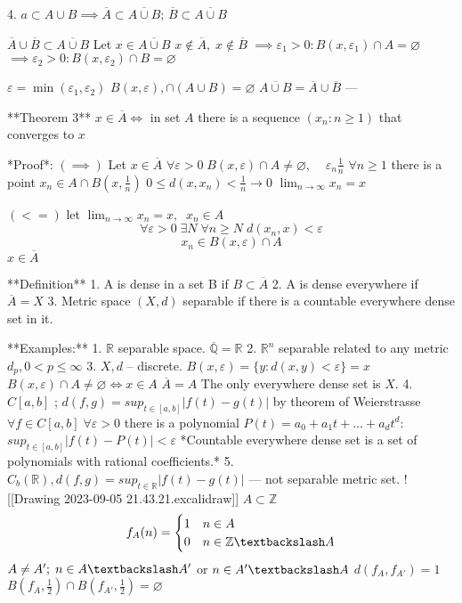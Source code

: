 4. $a \subset A \cup B \implies \overline{A} \subset \overline{A \cup B}$; $\overline{B} \subset \overline{A \cup B}$

$\overline{A} \cup \overline{B} \subset \overline{A \cup B}$
Let $x \in \overline{A \cup B}$
$x \not\in \overline{A}, \; x\not\in \overline{B}$
$\implies \varepsilon_{1} > 0 : B(x, \varepsilon_{1}) \cap A = \varnothing$
$\implies \varepsilon_{2} > 0 : B(x, \varepsilon_{2}) \cap B = \varnothing$

$\varepsilon = \min(\varepsilon_{1}, \varepsilon_{2})$
$B(x, \varepsilon), \cap (A \cup B) = \varnothing$
$\overline{A \cup B} = \overline{A} \cup \overline{B}$
---

**Theorem 3**
$x \in \overline{A} \iff$ in set $A$ there is a sequence $(x_{n}: n \geq 1)$ that converges to $x$

*Proof*:
$(\implies)$
Let $x \in \overline{A}$
$\forall \varepsilon > 0 \; B(x, \varepsilon) \cap A \neq \varnothing, \;\;\;\; \varepsilon_{n} \frac{1}{n}$
$\forall n \geq 1$ there is a point $x_{n} \in A \cap B(x, \frac{1}{n})$
$0 \leq d(x, x_{n}) < \frac{1}{n} \to 0$
$\lim_{ n \to \infty }x_{n} = x$

$(< =)$
let $\lim_{ n \to \infty }x_{n} = x, \;\; x_{n} \in A$
$$
\forall \varepsilon > 0 \; \exists N \; \forall n \geq N \; d(x_{n}, x) < \varepsilon
$$
$$
x_{n} \in B(x, \varepsilon) \cap A
$$
$x \in \overline{A}$

**Definition**
1. A is dense in a set B if $B \subset \overline{A}$
2. A is dense everywhere if $\overline{A} = X$
3. Metric space $(X, d)$ separable if there is a countable everywhere dense set in it.

**Examples:**
1. $\mathbb{R}$ separable space. $\overline{\mathbb{Q}} = \mathbb{R}$
2. $\mathbb{R}^n$ separable related to any metric $d_{p}, 0 < p \leq \infty$
3. $X, d$ – discrete. $B(x, \varepsilon) = \{ y: d(x, y) < \varepsilon \} = x$
   $B(x, \varepsilon) \cap A \neq \varnothing \iff x \in A$
   $\overline{A} = A$
   The only everywhere dense set is $X$.
4. $C[a,b]$ ; $d(f,g) = sup_{t \in [a,b]} |f(t) - g(t)|$
   by theorem of Weierstrasse $\forall f \in C[a,b] \; \forall \varepsilon > 0$ there is a polynomial $P(t) = a_{0} + a_{1}t + \dots + a_{d}t^d$: $sup_{t\in [a,b]} |f(t) - P(t)| < \varepsilon$
   *Countable everywhere dense set is a set of polynomials with rational coefficients.*
   5. $C_{b}(\mathbb{R}), d(f,g) = sup_{t \in \mathbb{R}} |f(t) - g(t)|$ — not separable metric set.
   ![[Drawing 2023-09-05 21.43.21.excalidraw]]
   $A \subset \mathbb{Z}$
   $$f_{A} (n) = \begin{cases}
1 & n \in A \\
0 & n \in \mathbb{Z} \textbackslash A
\end{cases}$$
$A \neq A'; \; n \in A \textbackslash A'$ or $n \in A' \textbackslash A$
$d(f_{A}, f_{A'}) = 1$
$B\left( f_{A}, \frac{1}{2} \right) \cap B(f_{A'}, \frac{1}{2}) = \varnothing$


